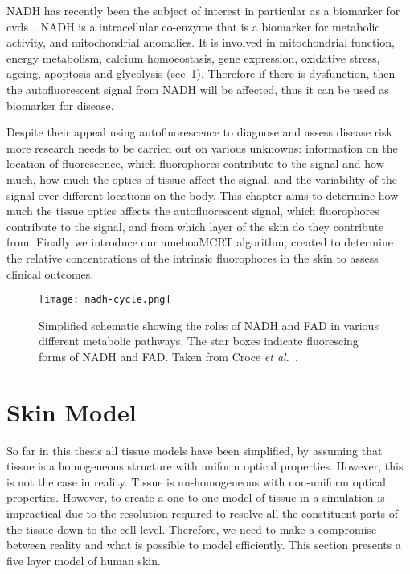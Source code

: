 NADH has recently been the subject of interest in particular as a biomarker for \gls*{cvds}~\cite{akbar2014vivo,elahi2009oxidative,blacker2016investigating}.
NADH is a intracellular co-enzyme that is a biomarker for metabolic activity, and mitochondrial anomalies. 
It is involved in mitochondrial function, energy metabolism, calcium homoeostasis, gene expression, oxidative stress, ageing, apoptosis and glycolysis (see~\cref{fig:nadhfadpath}).
Therefore if there is dysfunction, then the autofluorescent signal from NADH will be affected, thus it can be used as biomarker for disease.

Despite their appeal using autofluorescence to diagnose and assess disease risk more research needs to be carried out on various unknowns: information on the location of fluorescence, which fluorophores contribute to the signal and how much, how much the optics of tissue affect the signal, and the variability of the signal over different locations on the body.
This chapter aims to determine how much the tissue optics affects the autofluorescent signal, which fluorophores contribute to the signal, and from which layer of the skin do they contribute from.
Finally we introduce our ameboaMCRT algorithm, created to determine the relative concentrations of the intrinsic fluorophores in the skin to assess clinical outcomes.


\begin{figure}[!htpb]
  \centering
  \texttt{[image: nadh-cycle.png]}
  \caption{Simplified schematic showing the roles of NADH and FAD in various different metabolic pathways. The star boxes indicate fluorescing forms of NADH and FAD. Taken from Croce \textit{et al.}~\cite{croce2014autofluorescence}.}
  \label{fig:nadhfadpath}
\end{figure}


\FloatBarrier

\section{Skin Model}

So far in this thesis all tissue models have been simplified, by assuming that tissue is a homogeneous structure with uniform optical properties.
However, this is not the case in reality.
Tissue is un-homogeneous with non-uniform optical properties.
However, to create a one to one model of tissue in a simulation is impractical due to the resolution required to resolve all the constituent parts of the tissue down to the cell level.
Therefore, we need to make a compromise between reality and what is possible to model efficiently.
This section presents a five layer model of human skin. 


